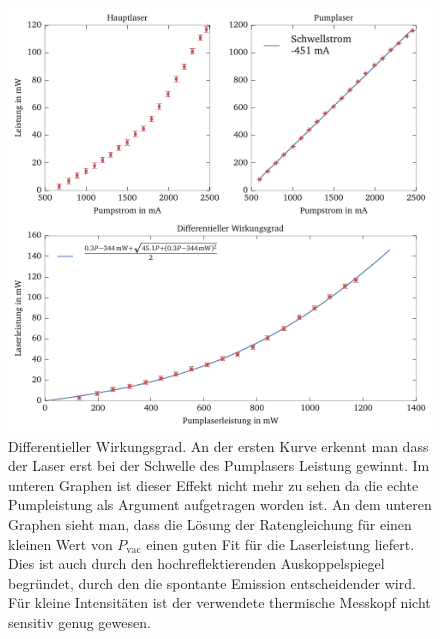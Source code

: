 \documentclass[11pt,twoside=true]{scrartcl}
\begin{document}
\begin{figure}
  \centering
  \includegraphics[width=1\textwidth]{./figures/slope_efficiency.pdf}
  \caption{Differentieller Wirkungsgrad. An der ersten Kurve erkennt man
  dass der Laser erst bei der Schwelle des Pumplasers Leistung gewinnt. Im
  unteren Graphen ist dieser Effekt nicht mehr zu sehen da die echte
  Pumpleistung als Argument aufgetragen worden ist. An dem unteren Graphen
  sieht man, dass die Lösung der Ratengleichung für einen kleinen Wert von
  $P_\text{vac}$ einen guten Fit für die Laserleistung liefert. Dies ist auch
  durch den hochreflektierenden Auskoppelspiegel begründet, durch den die
  spontante Emission entscheidender wird.  Für kleine Intensitäten ist der
  verwendete thermische Messkopf nicht sensitiv genug gewesen.}

  \label{fig:slope_efficiency}
\end{figure}
\end{document}
